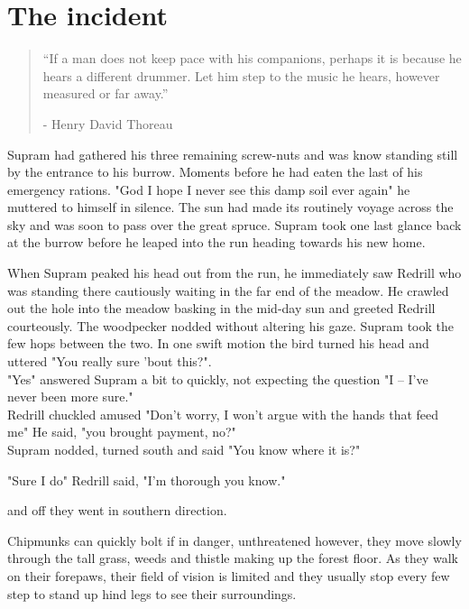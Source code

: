 \documentclass[smalldemyvopaper,11pt,twoside,onecolumn,openright,extrafontsizes]{memoir}
\begin{document}
\chapter{The incident}

\vspace{-1.3cm}
\begin{localsize}{10}
	\begin{quote}
		“If a man does not keep pace with his companions, perhaps it is because he hears a different drummer. Let him step to the music he hears, however measured or far away.”
		\begin{flushright}- Henry David Thoreau \end{flushright}
	\end{quote} 
\end{localsize}
\vspace{1cm}


Supram had gathered his three remaining screw-nuts and was know standing still by the entrance to his burrow. Moments before he had eaten the last of his 
emergency rations. "God I hope I never see this damp soil ever again" he muttered to himself in silence. The sun had made its routinely voyage across the sky and was soon to pass over the great spruce. Supram took one last glance back at the burrow before he leaped into the run heading towards his new home. 

When Supram peaked his head out from the run, he immediately saw Redrill who was standing there cautiously waiting in the far end of the meadow. He crawled out the hole into the meadow basking in the mid-day sun and greeted Redrill courteously. The woodpecker nodded without altering his gaze. Supram took the few hops between the two. In one swift motion the bird turned his head and uttered "You really sure 'bout this?".\\

"Yes" answered Supram a bit to quickly, not expecting the question "I -- I've never been more sure."\\

Redrill chuckled amused "Don't worry, I won't argue with the hands that feed me" He said, "you brought payment, no?"\\

Supram nodded, turned south and said "You know where it is?"

"Sure I do" Redrill said, "I'm thorough you know."

and off they went in southern direction.

Chipmunks can quickly bolt if in danger, unthreatened however, they move slowly through the tall grass, weeds and thistle making up the forest floor. As they walk on their forepaws, their field of vision is limited and they usually stop every few step to stand up hind legs to see their surroundings.
\end{document}
